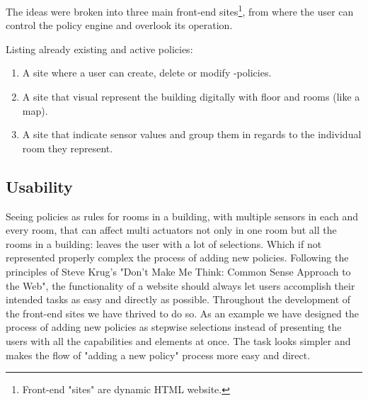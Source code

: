 The ideas were broken into three main front-end sites\footnote{Front-end "sites" are dynamic HTML website.}, from where the user can control the policy engine and overlook its operation.

Listing already existing and active policies:
\begin{enumerate}
\item A site where a user can create, delete or modify -policies.
\item A site that visual represent the building digitally with floor and rooms (like a map).
\item A site that indicate sensor values and group them in regards to the individual room they represent.
\end{enumerate}
	

\subsection{Usability}
Seeing policies as rules for rooms in a building, with multiple sensors in each and every room, that can affect multi actuators not only in one room but all the rooms in a building: leaves the user with a lot of selections. Which if not represented properly complex the process of adding new policies.
Following the principles of Steve Krug's "Don't Make Me Think: Common Sense Approach to the Web"\cite{Krug:2005:DMM:1051204}, the functionality of a website should always let users accomplish their intended tasks as easy and directly as possible. Throughout the development of the front-end sites we have thrived to do so.
As an example we have designed the process of adding new policies as stepwise selections instead of presenting the users with all the capabilities and elements at once. The task looks simpler and makes the flow of  "adding a new policy" process more easy and direct.

